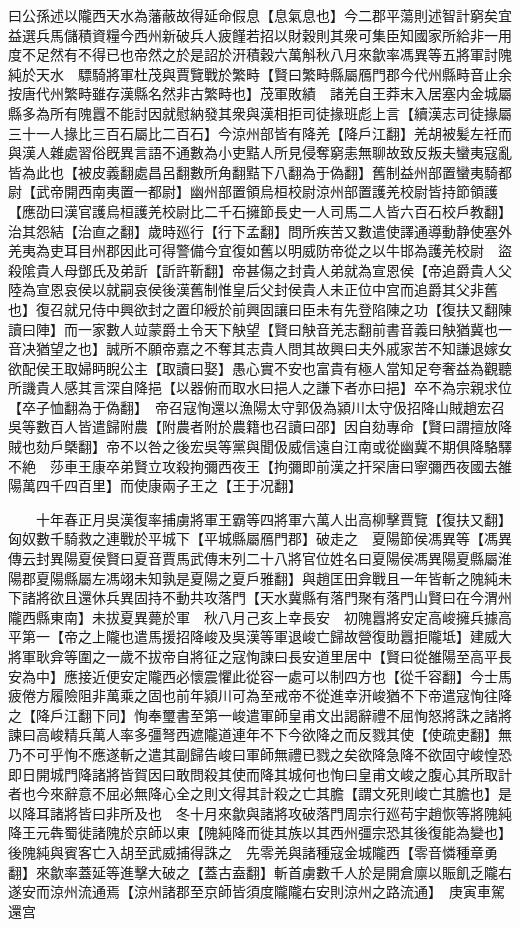 曰公孫述以隴西天水為藩蔽故得延命假息【息氣息也】今二郡平蕩則述智計窮矣宜益選兵馬儲積資糧今西州新破兵人疲饉若招以財穀則其衆可集臣知國家所給非一用度不足然有不得已也帝然之於是詔於汧積穀六萬斛秋八月來歙率馮異等五將軍討隗純於天水　驃騎將軍杜茂與賈覽戰於繁畤【賢曰繁畤縣屬鴈門郡今代州縣畤音止余按唐代州繁畤雖存漢縣名然非古繁畤也】茂軍敗績　諸羌自王莽末入居塞内金城屬縣多為所有隗囂不能討因就慰納發其衆與漢相拒司徒掾班彪上言【續漢志司徒掾屬三十一人掾比三百石屬比二百石】今涼州部皆有降羌【降戶江翻】羌胡被髪左祍而與漢人雜處習俗旣異言語不通數為小吏黠人所見侵奪窮恚無聊故致反叛夫蠻夷寇亂皆為此也【被皮義翻處昌呂翻數所角翻黠下八翻為于偽翻】舊制益州部置蠻夷騎都尉【武帝開西南夷置一都尉】幽州部置領烏桓校尉涼州部置護羌校尉皆持節領護【應劭曰漢官護烏桓護羌校尉比二千石擁節長史一人司馬二人皆六百石校戶教翻】治其怨結【治直之翻】歲時廵行【行下孟翻】問所疾苦又數遣使譯通導動静使塞外羌夷為吏耳目州郡因此可得警備今宜復如舊以明威防帝從之以牛邯為護羌校尉　盜殺隂貴人母鄧氏及弟訢【訢許靳翻】帝甚傷之封貴人弟就為宣恩侯【帝追爵貴人父陸為宣恩哀侯以就嗣哀侯後漢舊制惟皇后父封侯貴人未正位中宫而追爵其父非舊也】復召就兄侍中興欲封之置印綬於前興固讓曰臣未有先登陷陳之功【復扶又翻陳讀曰陣】而一家數人竝蒙爵土令天下觖望【賢曰觖音羌志翻前書音義曰觖猶冀也一音决猶望之也】誠所不願帝嘉之不奪其志貴人問其故興曰夫外戚家苦不知謙退嫁女欲配侯王取婦眄睨公主【取讀曰娶】愚心實不安也富貴有極人當知足夸奢益為觀聽所譏貴人感其言深自降挹【以器俯而取水曰挹人之謙下者亦曰挹】卒不為宗親求位【卒子恤翻為于偽翻】　帝召寇恂還以漁陽太守郭伋為潁川太守伋招降山賊趙宏召吳等數百人皆遣歸附農【附農者附於農籍也召讀曰邵】因自劾專命【賢曰謂擅放降賊也劾戶槩翻】帝不以咎之後宏吳等黨與聞伋威信遠自江南或從幽冀不期俱降駱驛不絶　莎車王康卒弟賢立攻殺拘彌西夜王【拘彌即前漢之扞罙唐曰寧彌西夜國去雒陽萬四千四百里】而使康兩子王之【王于况翻】

　　十年春正月吳漢復率捕虜將軍王霸等四將軍六萬人出高柳擊賈覽【復扶又翻】匈奴數千騎救之連戰於平城下【平城縣屬鴈門郡】破走之　夏陽節侯馮異等【馮異傳云封異陽夏侯賢曰夏音賈馬武傳末列二十八將官位姓名曰夏陽侯馮異陽夏縣屬淮陽郡夏陽縣屬左馮翊未知孰是夏陽之夏戶雅翻】與趙匡田弇戰且一年皆斬之隗純未下諸將欲且還休兵異固持不動共攻落門【天水冀縣有落門聚有落門山賢曰在今渭州隴西縣東南】未拔夏異薨於軍　秋八月己亥上幸長安　初隗囂將安定高峻擁兵據高平第一【帝之上隴也遣馬援招降峻及吳漢等軍退峻亡歸故營復助囂拒隴坻】建威大將軍耿弇等圍之一歲不拔帝自將征之寇恂諫曰長安道里居中【賢曰從雒陽至高平長安為中】應接近便安定隴西必懷震懼此從容一處可以制四方也【從千容翻】今士馬疲倦方履險阻非萬乘之固也前年潁川可為至戒帝不從進幸汧峻猶不下帝遣寇恂往降之【降戶江翻下同】恂奉璽書至第一峻遣軍師皇甫文出謁辭禮不屈恂怒將誅之諸將諫曰高峻精兵萬人率多彊弩西遮隴道連年不下今欲降之而反戮其使【使疏吏翻】無乃不可乎恂不應遂斬之遣其副歸告峻曰軍師無禮已戮之矣欲降急降不欲固守峻惶恐即日開城門降諸將皆賀因曰敢問殺其使而降其城何也恂曰皇甫文峻之腹心其所取計者也今來辭意不屈必無降心全之則文得其計殺之亡其膽【謂文死則峻亡其膽也】是以降耳諸將皆曰非所及也　冬十月來歙與諸將攻破落門周宗行廵苟宇趙恢等將隗純降王元犇蜀徙諸隗於京師以東【隗純降而徙其族以其西州彊宗恐其後復能為變也】後隗純與賓客亡入胡至武威捕得誅之　先零羌與諸種寇金城隴西【零音憐種章勇翻】來歙率蓋延等進擊大破之【蓋古盍翻】斬首虜數千人於是開倉廪以賑飢乏隴右遂安而涼州流通焉【涼州諸郡至京師皆須度隴隴右安則涼州之路流通】　庚寅車駕還宫

